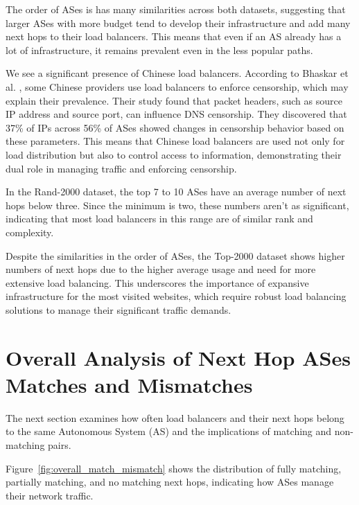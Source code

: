\documentclass[12pt]{cwru_thesis}
\begin{document}
The order of ASes is has many similarities across both datasets, suggesting that larger ASes with more budget tend to develop their infrastructure and add many next hops to their load balancers. This means that even if an AS already has a lot of infrastructure, it remains prevalent even in the less popular paths.

We see a significant presence of Chinese load balancers. According to Bhaskar et al.  \cite{bhaskar2021}, some Chinese providers use load balancers to enforce censorship, which may explain their prevalence. Their study found that packet headers, such as source IP address and source port, can influence DNS censorship. They discovered that 37\% of IPs across 56\% of ASes showed changes in censorship behavior based on these parameters. This means that Chinese load balancers are used not only for load distribution but also to control access to information, demonstrating their dual role in managing traffic and enforcing censorship.

In the Rand-2000 dataset, the top 7 to 10 ASes have an average number of next hops below three. Since the minimum is two, these numbers aren't as significant, indicating that most load balancers in this range are of similar rank and complexity.

Despite the similarities in the order of ASes, the Top-2000 dataset shows higher numbers of next hops due to the higher average usage and need for more extensive load balancing. This underscores the importance of expansive infrastructure for the most visited websites, which require robust load balancing solutions to manage their significant traffic demands.

\newpage
\section{Overall Analysis of Next Hop ASes Matches and Mismatches}
The next section examines how often load balancers and their next hops belong to the same Autonomous System (AS) and the implications of matching and non-matching pairs.

Figure~\ref{fig:overall_match_mismatch} shows the distribution of fully matching, partially matching, and no matching next hops, indicating how ASes manage their network traffic. 
\end{document}
